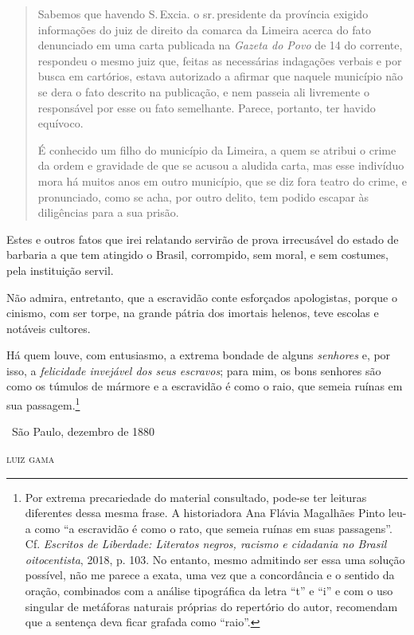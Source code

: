 \begin{quote}
Sabemos que havendo S.\,Excia. o sr.\,presidente da província exigido
informações do juiz de direito da comarca da Limeira acerca do
fato denunciado em uma carta publicada na \emph{Gazeta do Povo} de 14 do
corrente, respondeu o mesmo juiz que, feitas as necessárias indagações
verbais e por busca em cartórios, estava autorizado a afirmar que
naquele município não se dera o fato descrito na publicação, e nem
passeia ali livremente o responsável por esse ou fato semelhante.
Parece, portanto, ter havido equívoco.

É conhecido um filho do município da Limeira, a quem se atribui o crime
da ordem e gravidade de que se acusou a aludida carta, mas esse
indivíduo mora há muitos anos em outro município, que se diz fora teatro
do crime, e pronunciado, como se acha, por outro delito, tem podido
escapar às diligências para a sua prisão.
\end{quote}

Estes e outros fatos que irei relatando servirão de prova irrecusável do
estado de barbaria a que tem atingido o Brasil, corrompido, sem moral, e
sem costumes, pela instituição servil.

Não admira, entretanto, que a escravidão conte esforçados apologistas,
porque o cinismo, com ser torpe, na grande pátria dos imortais helenos,
teve escolas e notáveis cultores.

Há quem louve, com entusiasmo, a extrema bondade de alguns
\emph{senhores} e, por isso, a \emph{felicidade invejável dos seus
escravos}; para mim, os bons senhores são como os túmulos de mármore e a
escravidão é como o raio, que semeia ruínas em sua passagem.\footnote{
  Por extrema precariedade do material consultado, pode-se ter leituras
  diferentes dessa mesma frase. A historiadora Ana Flávia Magalhães
  Pinto leu-a como ``a escravidão é como o rato, que semeia ruínas em
  suas passagens''. Cf. \emph{Escritos de Liberdade: Literatos negros,
  racismo e cidadania no Brasil oitocentista}, 2018, p. 103. No entanto,
mesmo admitindo ser essa uma solução possível, não me parece a exata,
uma vez que a concordância e o sentido da oração, combinados com a análise tipográfica da letra ``t'' e
  ``i'' e com o uso singular de metáforas naturais
  próprias do repertório do autor, recomendam que a sentença deva ficar
  grafada como ``raio''.}

\hfill\ São Paulo, dezembro de 1880

\hfill\textsc{luiz gama}



